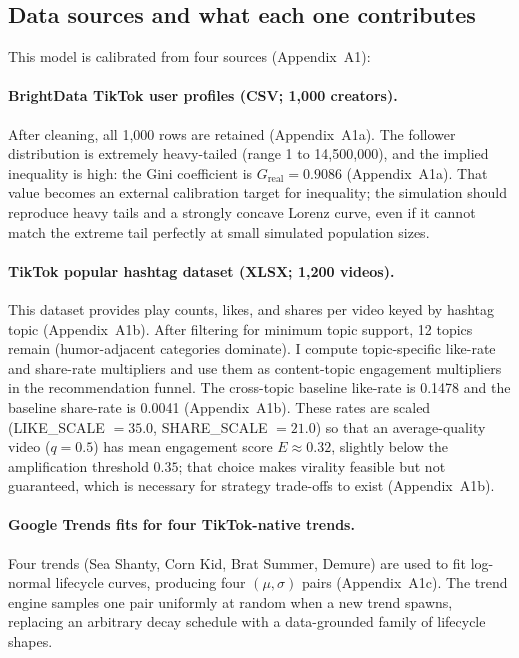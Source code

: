 \documentclass[10pt]{article}
\newcommand{\appref}[1]{(Appendix~#1)}
\begin{document}
\subsection{Data sources and what each one contributes}
This model is calibrated from four sources \appref{A1}:

\paragraph{BrightData TikTok user profiles (CSV; 1{,}000 creators).}
After cleaning, all 1{,}000 rows are retained \appref{A1a}. The follower distribution is extremely heavy-tailed (range 1 to 14{,}500{,}000), and the implied inequality is high: the Gini coefficient is \(G_{\text{real}} = 0.9086\) \appref{A1a}. That value becomes an external calibration target for inequality; the simulation should reproduce heavy tails and a strongly concave Lorenz curve, even if it cannot match the extreme tail perfectly at small simulated population sizes.

\paragraph{TikTok popular hashtag dataset (XLSX; 1{,}200 videos).}
This dataset provides play counts, likes, and shares per video keyed by hashtag topic \appref{A1b}. After filtering for minimum topic support, 12 topics remain (humor-adjacent categories dominate). I compute topic-specific like-rate and share-rate multipliers and use them as content-topic engagement multipliers in the recommendation funnel. The cross-topic baseline like-rate is 0.1478 and the baseline share-rate is 0.0041 \appref{A1b}. These rates are scaled (LIKE\_SCALE \(=35.0\), SHARE\_SCALE \(=21.0\)) so that an average-quality video (\(q=0.5\)) has mean engagement score \(E \approx 0.32\), slightly below the amplification threshold \(0.35\); that choice makes virality feasible but not guaranteed, which is necessary for strategy trade-offs to exist \appref{A1b}.

\paragraph{Google Trends fits for four TikTok-native trends.}
Four trends (Sea Shanty, Corn Kid, Brat Summer, Demure) are used to fit log-normal lifecycle curves, producing four \((\mu,\sigma)\) pairs \appref{A1c}. The trend engine samples one pair uniformly at random when a new trend spawns, replacing an arbitrary decay schedule with a data-grounded family of lifecycle shapes.
\end{document}
